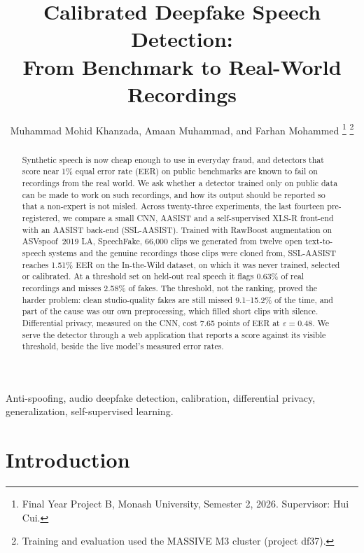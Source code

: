 \documentclass[journal]{IEEEtran}
\begin{document}
\title{Calibrated Deepfake Speech Detection:\\From Benchmark to Real-World Recordings}

\author{Muhammad Mohid Khanzada, Amaan Muhammad, and Farhan Mohammed
\thanks{Final Year Project B, Monash University, Semester 2, 2026. Supervisor: Hui Cui.}
\thanks{Training and evaluation used the MASSIVE M3 cluster (project df37).}}

\maketitle

\begin{abstract}
Synthetic speech is now cheap enough to use in everyday fraud, and detectors
that score near 1\% equal error rate (EER) on public benchmarks are known to
fail on recordings from the real world. We ask whether a detector trained only
on public data can be made to work on such recordings, and how its output
should be reported so that a non-expert is not misled. Across twenty-three
experiments, the last fourteen pre-registered, we compare a small CNN, AASIST
and a self-supervised XLS-R front-end with an AASIST back-end (SSL-AASIST).
Trained with RawBoost augmentation on ASVspoof~2019 LA, SpeechFake, 66{,}000
clips we generated from twelve open text-to-speech systems and the genuine
recordings those clips were cloned from, SSL-AASIST reaches 1.51\% EER on the
In-the-Wild dataset, on which it was never trained, selected or calibrated. At
a threshold set on held-out real speech it flags 0.63\% of real recordings and
misses 2.58\% of fakes. The threshold, not the ranking, proved the harder
problem: clean studio-quality fakes are still missed 9.1--15.2\% of the time,
and part of the cause was our own preprocessing, which filled short clips
with silence.
Differential privacy, measured on the CNN, cost 7.65 points of EER at
$\varepsilon = 0.48$. We serve the detector through a web application that
reports a score against its visible threshold, beside the live model's
measured error rates.
\end{abstract}

\begin{IEEEkeywords}
Anti-spoofing, audio deepfake detection, calibration, differential privacy,
generalization, self-supervised learning.
\end{IEEEkeywords}

\section{Introduction}
\end{document}
